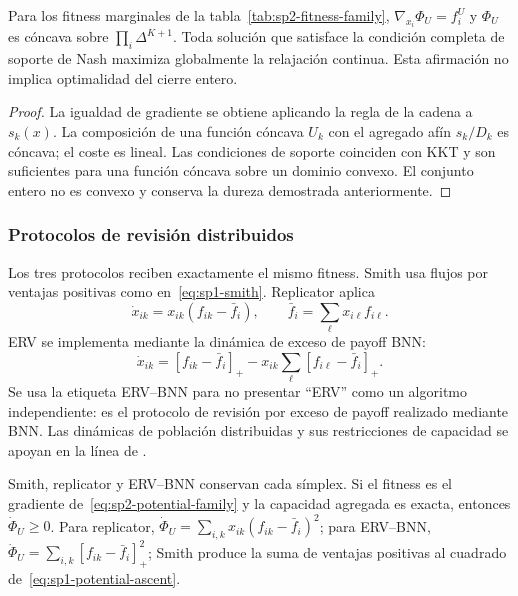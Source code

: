 \begin{proposicion}
Para los fitness marginales de la tabla~\ref{tab:sp2-fitness-family},
$\nabla_{x_i}\Phi_U=f_i^U$ y $\Phi_U$ es cóncava sobre
$\prod_i\Delta^{K+1}$. Toda solución que satisface la condición completa de soporte
de Nash maximiza globalmente la relajación continua. Esta afirmación no implica
optimalidad del cierre entero.
\end{proposicion}
\begin{proof}
La igualdad de gradiente se obtiene aplicando la regla de la cadena a
$s_k(x)$. La composición de una función cóncava $U_k$ con el agregado afín $s_k/D_k$
es cóncava; el coste es lineal. Las condiciones de soporte coinciden con KKT y son
suficientes para una función cóncava sobre un dominio convexo. El conjunto entero no
es convexo y conserva la dureza demostrada anteriormente.
\end{proof}

\subsubsection{Protocolos de revisión distribuidos}

Los tres protocolos reciben exactamente el mismo fitness. Smith usa flujos por ventajas
positivas como en~\eqref{eq:sp1-smith}. Replicator aplica
\begin{equation}
 \dot x_{ik}=x_{ik}(f_{ik}-\bar f_i),
 \qquad \bar f_i=\sum_\ell x_{i\ell}f_{i\ell}.
\end{equation}
ERV se implementa mediante la dinámica de exceso de payoff BNN:
\begin{equation}
 \dot x_{ik}=[f_{ik}-\bar f_i]_+
 -x_{ik}\sum_\ell[f_{i\ell}-\bar f_i]_+.
 \label{eq:sp2-erv-bnn}
\end{equation}
Se usa la etiqueta ERV--BNN para no presentar ``ERV'' como un algoritmo independiente:
es el protocolo de revisión por exceso de payoff realizado mediante BNN. Las dinámicas
de población distribuidas y sus restricciones de capacidad se apoyan en la línea de
\citet{quijano2017population,martinezpiazuelo2022tcss,martinezpiazuelo2022automatica}.

\begin{proposicion}
Smith, replicator y ERV--BNN conservan cada símplex. Si el fitness es el gradiente
de~\eqref{eq:sp2-potential-family} y la capacidad agregada es exacta, entonces
$\dot\Phi_U\geq0$. Para replicator,
$\dot\Phi_U=\sum_{i,k}x_{ik}(f_{ik}-\bar f_i)^2$; para ERV--BNN,
$\dot\Phi_U=\sum_{i,k}[f_{ik}-\bar f_i]_+^2$; Smith produce la suma de ventajas
positivas al cuadrado de~\eqref{eq:sp1-potential-ascent}.
\end{proposicion}

